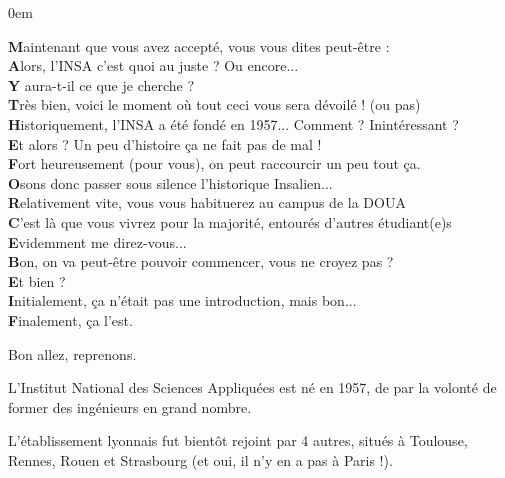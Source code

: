 \vspace{1em}
{
    \footnotesize
    \parindent 0em
    \begin{changemargin}{-1cm}{0cm}
\textbf{M}aintenant que vous avez accepté, vous vous dites peut-être :\\
\textbf{A}lors, l'INSA c'est quoi au juste ? Ou encore...\\
\textbf{Y} aura-t-il ce que je cherche ?\\

\textbf{T}rès bien, voici le moment où tout ceci vous sera dévoilé ! (ou pas)\\
\textbf{H}istoriquement, l'INSA a été fondé en 1957... Comment ? Inintéressant ?\\
\textbf{E}t alors ? Un peu d'histoire ça ne fait pas de mal !\\

\textbf{F}ort heureusement (pour vous), on peut raccourcir un peu tout ça.\\
\textbf{O}sons donc passer sous silence l'historique Insalien...\\
\textbf{R}elativement vite, vous vous habituerez au campus de la DOUA\\
\textbf{C}'est là que vous vivrez pour la majorité, entourés d'autres étudiant(e)s\\
\textbf{E}videmment me direz-vous...\\

\textbf{B}on, on va peut-être pouvoir commencer, vous ne croyez pas ?\\
\textbf{E}t bien ?\\

\textbf{I}nitialement, ça n'était pas une introduction, mais bon...\\
\textbf{F}inalement, ça l'est.\\
\end{changemargin}
} %

Bon allez, reprenons.

\vspace{1em}

L'Institut National des Sciences Appliquées est né en 1957, de par la volonté de
former des ingénieurs en grand nombre.

\vspace{1em}

L'établissement lyonnais fut bientôt rejoint par 4 autres, situés à Toulouse, Rennes, Rouen
et Strasbourg (et oui, il n'y en a pas à Paris !).

\vspace{1em}

